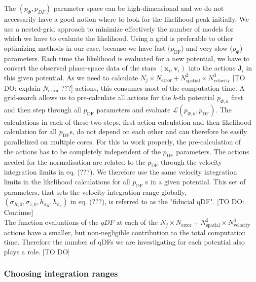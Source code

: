 \documentclass[12pt,preprint]{aastex}
\newcommand{\vect}[1]{\boldsymbol{#1}} %
\begin{document}
The $(p_\Phi,p_{DF})$ parameter space can be high-dimensional and we do not necessarily have a good notion where to look for the likelihood peak initially. We use a nested-grid approach to minimize effectively the number of models for which we have to evaluate the likelihood. Using a grid is preferable to other optimizing methods in our case, because we have fast ($p_\text{DF}$) and very slow ($p_\Phi$) parameters. Each time the likelihood is evaluated for a new potential, we have to convert the observed phase-space data of the stars $(\vect{x}_i,\vect{v}_i)$ into the actions $\vect{J}_i$ in this given potential. As we need to calculate  $N_j \times N_\text{error} +  N_\text{spatial}^2 \times N_\text{velocity}^3$ [TO DO: explain $N_\text{error}$ ???] actions, this consumes most of the computation time. A grid-search allows us to pre-calculate all actions for the $k$-th potential $p_{\Phi,k}$ first and then step through all $p_\text{DF}$ parameters and evaluate $\mathscr{L} (p_{\Phi,k},p_\text{DF})$. The calculations in each of these two steps, first action calculation and then likelihood calculation for all $p_\text{DF}$s, do not depend on each other and can therefore be easily parallelized on multiple cores. For this to work properly, the pre-calculation of the actions has to be completely independent of the $p_\text{DF}$ parameters. The actions needed for the normalisation are related to the $p_\text{DF}$ through the velocity integration limits in eq. (???). We therefore use the same velocity integration limits in the likelihood calculations for all $p_\text{DF}$ s in a given potential. This set of parameters, that sets the velocity integration range globally, $(\sigma_{R,0},\sigma_{z,0},h_{\sigma_R},h_{\sigma_z})$ in eq. (???), is referred to as the "fiducial qDF". [TO DO: Continue]
\\The function evaluations of the $qDF$ at each of the $N_j \times N_\text{error} +  N_\text{spatial}^2 \times N_\text{velocity}^3$ actions have a smaller, but non-negligible contribution to the total computation time. Therefore the number of qDFs we are investigating for each potential also plays a role.
[TO DO]



\subsubsection{Choosing integration ranges}
\end{document}
